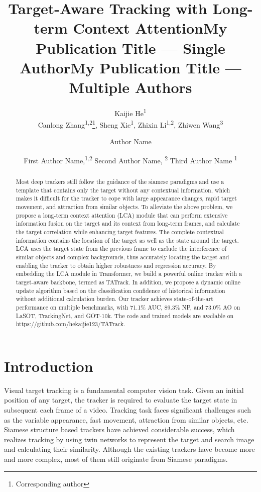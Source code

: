 \documentclass[letterpaper]{article} \usepackage{aaai23}  \usepackage{times}  \usepackage{helvet}  \usepackage{courier}  \usepackage[hyphens]{url}  \usepackage{graphicx} \urlstyle{rm} \def\UrlFont{\rm}  \usepackage{natbib}  \usepackage{caption} \frenchspacing  \setlength{\pdfpagewidth}{8.5in}  \setlength{\pdfpageheight}{11in}  \usepackage{algorithm}
\title{Target-Aware Tracking with Long-term Context Attention}
\author{
Kaijie He\textsuperscript{\rm 1}\\
    Canlong Zhang\textsuperscript{\rm 1,\rm 2}\thanks{Corresponding author},
    Sheng Xie\textsuperscript{\rm 1},
    Zhixin Li\textsuperscript{\rm 1,\rm 2},
    Zhiwen Wang\textsuperscript{\rm 3}
}
\title{My Publication Title --- Single Author}
\author {
    Author Name
}
\title{My Publication Title --- Multiple Authors}
\author {
First Author Name,\textsuperscript{\rm 1,\rm 2}
    Second Author Name, \textsuperscript{\rm 2}
    Third Author Name \textsuperscript{\rm 1}
}
\begin{document}
\maketitle

\begin{abstract}
    Most deep trackers still follow the guidance of the siamese paradigms and use a template that contains only the target without any contextual information, which makes it difficult for the tracker to cope with large appearance changes, rapid target movement, and attraction from similar objects. To alleviate the above problem, we propose a long-term context attention (LCA) module that can perform extensive information fusion on the target and its context from long-term frames, and calculate the target correlation while enhancing target features. The complete contextual information contains the location of the target as well as the state around the target. LCA uses the target state from the previous frame to exclude the interference of similar objects and complex backgrounds, thus accurately locating the target and enabling the tracker to obtain higher robustness and regression accuracy. By embedding the LCA module in Transformer, we build a powerful online tracker with a target-aware backbone, termed as TATrack. In addition, we propose a dynamic online update algorithm based on the classification confidence of historical information without additional calculation burden. Our tracker achieves state-of-the-art performance on multiple benchmarks, with 71.1\% AUC, 89.3\% NP, and 73.0\% AO on LaSOT, TrackingNet, and GOT-10k. The code and trained models are available on https://github.com/hekaijie123/TATrack.
\end{abstract}

\section{Introduction}

Visual target tracking is a fundamental computer vision task. Given an initial position of any target, the tracker is required to evaluate the target state in subsequent each frame of a video. Tracking task faces significant challenges such as the variable appearance, fast movement, attraction from similar objects, etc. Siamese structure based trackers have achieved considerable success, which realizes tracking by using twin networks to represent the target and search image and calculating their similarity. Although the existing trackers have become more and more complex, most of them still originate from Siamese paradigms.
\end{document}
